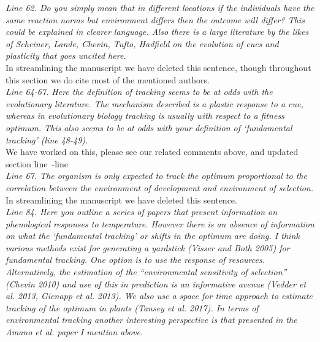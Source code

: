 \documentclass[11pt,letterpaper]{article}
\newcommand{\lr}[1]{line~\lineref{#1}}
\begin{document}
\emph{Line 62. Do you simply mean that in different locations if the individuals have the same
reaction norms but environment differs then the outcome will differ? This could be explained
in clearer language.  Also there is a large literature by the likes of Scheiner, Lande,
Chevin, Tufto, Hadfield on the evolution of cues and plasticity that goes uncited here.}\\

In streamlining the manuscript we have deleted this sentence, though throughout this section we do cite most of the mentioned authors.\\

\emph{Line 64-67. Here the definition of tracking seems to be at odds with the evolutionary
literature. The mechanism described is a plastic response to a cue, whereas in evolutionary
biology tracking is usually with respect to a fitness optimum. This also seems to be at odds
with your definition of `fundamental tracking' (line 48-49).}\\

We have worked on this, please see our related comments above, and updated section \lr{r1ass1}-\lr{moretrackE}\\

\emph{Line 67. The organism is only expected to track the optimum proportional to the correlation
between the environment of development and environment of selection.}\\

In streamlining the manuscript we have deleted this sentence.\\

\emph{Line 84. Here you outline a series of papers that present information on phenological
responses to temperature. However there is an absence of information on what the `fundamental
tracking' or shifts in the optimum are doing. I think various methods exist for generating a
yardstick (Visser and Both 2005) for fundamental tracking. One option is to use the response
of resources. Alternatively, the estimation of the ``environmental sensitivity of selection''
(Chevin 2010) and use of this in prediction is an informative avenue (Vedder et al. 2013,
Gienapp et al. 2013). We also use a space for time approach to estimate tracking of the
optimum in plants (Tansey et al. 2017). In terms of environmental tracking another
interesting perspective is that presented in the Amano et al. paper I mention above.}\\
\end{document}
